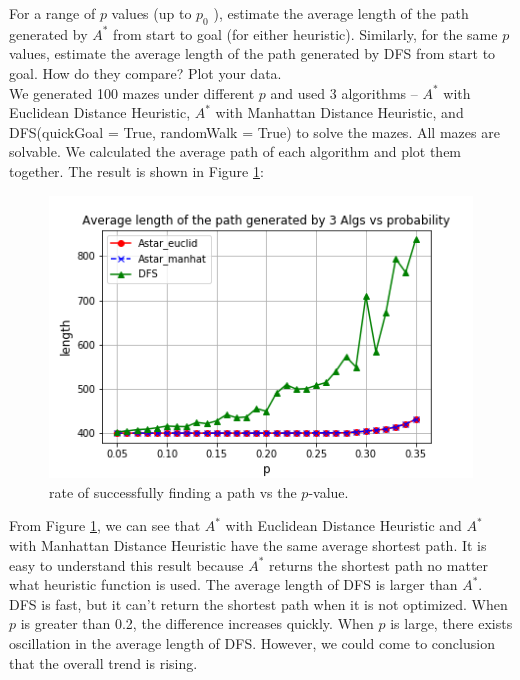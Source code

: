\documentclass[letter]{article}
\begin{document}
\begin{questions}
	\item {For a range of $ p $ values (up to $ p_0 $ ), estimate the average length of the path generated by $ A^* $ from start to goal (for either heuristic). Similarly, for the same $ p $ values, estimate the average length of the path generated by DFS from start to goal. How do they compare? Plot your data.} \\
	
	We generated 100 mazes under different $ p $ and used 3 algorithms -- $ A^* $ with Euclidean Distance Heuristic, $ A^* $ with Manhattan Distance Heuristic, and DFS(quickGoal = True, randomWalk = True) to solve the mazes. All mazes are solvable. We calculated the average path of each algorithm and plot them together. The result is shown in Figure \ref{fig:5}: \\
	
	\begin{figure}
		\centering
		\includegraphics[width=\textwidth]{../pics/question5.png}
		\caption{\label{fig:5}rate of successfully finding a path vs the $ p $-value.}
	\end{figure}
	
	From Figure \ref{fig:5}, we can see that $ A^* $ with Euclidean Distance Heuristic and $ A^* $ with Manhattan Distance Heuristic have the same average shortest path. It is easy to understand this result because $ A^* $ returns the shortest path no matter what heuristic function is used. The average length of DFS is larger than $ A^* $. DFS is fast, but it can’t return the shortest path when it is not optimized. When $ p $ is greater than 0.2, the difference increases quickly. When $ p $ is large, there exists oscillation in the average length of DFS. However, we could come to conclusion that the overall trend is rising. \\
	

\end{questions}
\end{document}

